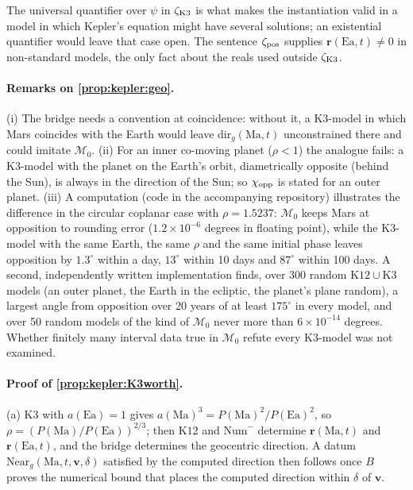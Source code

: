 The universal quantifier over $\psi$ in $\zeta_{\rm K3}$ is what makes the instantiation valid in a model in which Kepler's equation might have several solutions; an existential quantifier would leave that case open. The sentence $\zeta_{\rm pos}$ supplies $\mathbf r(\mathrm{Ea},t)\ne0$ in non-standard models, the only fact about the reals used outside $\zeta_{\rm K3}$.

\paragraph{Remarks on \cref{prop:kepler:geo}.}
(i) The bridge needs a convention at coincidence: without it, a $\mathrm{K3}$-model in which Mars coincides with the Earth would leave $\mathrm{dir}_g(\mathrm{Ma},t)$ unconstrained there and could imitate $\mathcal M_0$. (ii) For an inner co-moving planet ($\rho<1$) the analogue fails: a $\mathrm{K3}$-model with the planet on the Earth's orbit, diametrically opposite (behind the Sun), is always in the direction of the Sun; so $\chi_{\rm opp}$ is stated for an outer planet. (iii) A computation (code in the accompanying repository) illustrates the difference in the circular coplanar case with $\rho=1.5237$: $\mathcal M_0$ keeps Mars at opposition to rounding error ($1.2\times10^{-6}$ degrees in floating point), while the $\mathrm{K3}$-model with the same Earth, the same $\rho$ and the same initial phase leaves opposition by $1.3^\circ$ within a day, $13^\circ$ within 10 days and $87^\circ$ within 100 days. A second, independently written implementation finds, over 300 random $\mathrm{K12}\cup\mathrm{K3}$ models (an outer planet, the Earth in the ecliptic, the planet's plane random), a largest angle from opposition over 20 years of at least $175^\circ$ in every model, and over 50 random models of the kind of $\mathcal M_0$ never more than $6\times10^{-14}$ degrees. Whether finitely many interval data true in $\mathcal M_0$ refute every $\mathrm{K3}$-model was not examined.

\paragraph{Proof of \cref{prop:kepler:K3worth}.}
(a) $\mathrm{K3}$ with $a(\mathrm{Ea})=1$ gives $a(\mathrm{Ma})^3=P(\mathrm{Ma})^2/P(\mathrm{Ea})^2$, so $\rho=(P(\mathrm{Ma})/P(\mathrm{Ea}))^{2/3}$; then $\mathrm{K12}$ and $\mathrm{Num}^-$ determine $\mathbf r(\mathrm{Ma},t)$ and $\mathbf r(\mathrm{Ea},t)$, and the bridge determines the geocentric direction. A datum $\mathrm{Near}_g(\mathrm{Ma},t,\mathbf v,\delta)$ satisfied by the computed direction then follows once $B$ proves the numerical bound that places the computed direction within $\delta$ of $\mathbf v$.

